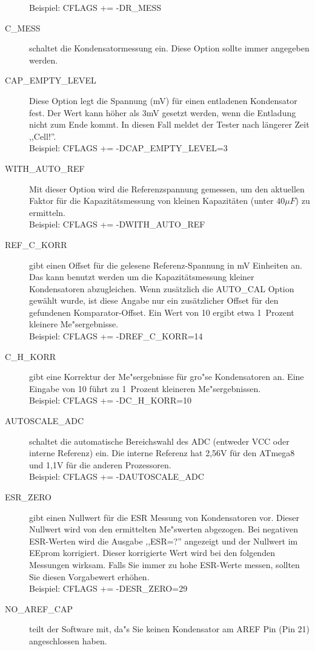 \begin{description}
Beispiel: CFLAGS += -DR\_MESS
  \item[C\_MESS] schaltet die Kondensatormessung ein.
 Diese Option sollte immer angegeben werden.\\
  \item[CAP\_EMPTY\_LEVEL] Diese Option legt die Spannung (mV) f\"ur einen entladenen Kondensator fest.
Der Wert kann h\"oher als 3mV gesetzt werden, wenn die Entladung nicht zum Ende kommt. In diesen Fall meldet der Tester nach l\"angerer Zeit ,,Cell!''.\\
Beispiel: CFLAGS += -DCAP\_EMPTY\_LEVEL=3
  \item[WITH\_AUTO\_REF] Mit dieser Option wird die Referenzspannung gemessen, um den aktuellen Faktor f\"ur die Kapazit\"atsmessung 
von kleinen Kapazit\"aten (unter \(40\mu F\)) zu ermitteln.\\
Beispiel:  CFLAGS += -DWITH\_AUTO\_REF
  \item[REF\_C\_KORR] gibt einen Offset f\"ur die gelesene Referenz-Spannung in mV Einheiten an.
Das kann benutzt werden um die Kapazit\"atsmessung kleiner Kondensatoren abzugleichen.
Wenn zus\"atzlich die AUTO\_CAL Option gew\"ahlt wurde, ist diese Angabe nur ein zus\"atzlicher Offset f\"ur
den gefundenen Komparator-Offset.
Ein Wert von 10 ergibt etwa 1~Prozent kleinere Me"sergebnisse.\\
Beispiel:  CFLAGS += -DREF\_C\_KORR=14
  \item[C\_H\_KORR] gibt eine Korrektur der Me"sergebnisse f\"ur gro"se Kondensatoren an.
Eine Eingabe von 10 f\"uhrt zu 1~Prozent kleineren Me"sergebnissen.\\
Beispiel:  CFLAGS += -DC\_H\_KORR=10
  \item[AUTOSCALE\_ADC] schaltet die automatische Bereichswahl des ADC (entweder VCC oder interne Referenz) ein.
Die interne Referenz hat 2,56V f\"ur den ATmega8 und 1,1V f\"ur die anderen Prozessoren.\\
Beispiel: CFLAGS += -DAUTOSCALE\_ADC
  \item[ESR\_ZERO] gibt einen Nullwert f\"ur die ESR Messung von Kondensatoren vor. Dieser Nullwert wird von den
ermittelten Me"swerten abgezogen. Bei negativen ESR-Werten wird die Ausgabe ,,ESR=?'' angezeigt und der Nullwert
im EEprom korrigiert. Dieser korrigierte Wert wird bei den folgenden Messungen wirksam.
Falls Sie immer zu hohe ESR-Werte messen, sollten Sie diesen Vorgabewert erh\"ohen.\\
Beispiel: CFLAGS += -DESR\_ZERO=29
  \item[NO\_AREF\_CAP] teilt der Software mit, da"s Sie keinen Kondensator am AREF Pin (Pin 21) angeschlossen haben.

\end{description}
